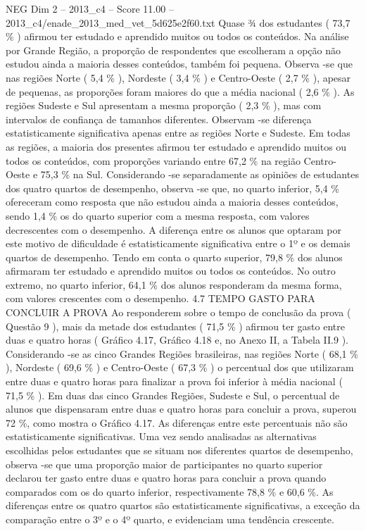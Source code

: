 \begin{textsample}{NEG Dim 2 – 2013\_c4 – Score 11.00 – 2013\_c4/enade\_2013\_med\_vet\_5d625e2f60.txt}
Quase ¾ dos estudantes ( 73,7 \% ) afirmou ter estudado e aprendido muitos ou todos os conteúdos.
Na análise por Grande Região, a proporção de respondentes que escolheram a opção não estudou ainda a maioria desses conteúdos, também foi pequena.
Observa -se que nas regiões Norte ( 5,4 \% ), Nordeste ( 3,4 \% ) e Centro-Oeste ( 2,7 \% ), apesar de pequenas, as proporções foram maiores do que a média nacional ( 2,6 \% ).
As regiões Sudeste e Sul apresentam a mesma proporção ( 2,3 \% ), mas com intervalos de confiança de tamanhos diferentes.
Observam -se diferença estatisticamente significativa apenas entre as regiões Norte e Sudeste.
Em todas as regiões, a maioria dos presentes afirmou ter estudado e aprendido muitos ou todos os conteúdos, com proporções variando entre 67,2 \% na região Centro-Oeste e 75,3 \% na Sul.
Considerando -se separadamente as opiniões de estudantes dos quatro quartos de desempenho, observa -se que, no quarto inferior, 5,4 \% ofereceram como resposta que não estudou ainda a maioria desses conteúdos, sendo 1,4 \% os do quarto superior com a mesma resposta, com valores decrescentes com o desempenho.
A diferença entre os alunos que optaram por este motivo de dificuldade é estatisticamente significativa entre o 1º e os demais quartos de desempenho.
Tendo em conta o quarto superior, 79,8 \% dos alunos afirmaram ter estudado e aprendido muitos ou todos os conteúdos.
No outro extremo, no quarto inferior, 64,1 \% dos alunos responderam da mesma forma, com valores crescentes com o desempenho. 4.7 TEMPO GASTO PARA CONCLUIR A PROVA Ao responderem sobre o tempo de conclusão da prova ( Questão 9 ), mais da metade dos estudantes ( 71,5 \% ) afirmou ter gasto entre duas e quatro horas ( Gráfico 4.17, Gráfico 4.18 e, no Anexo II, a Tabela II.9 ).
Considerando -se as cinco Grandes Regiões brasileiras, nas regiões Norte ( 68,1 \% ), Nordeste ( 69,6 \% ) e Centro-Oeste ( 67,3 \% ) o percentual dos que utilizaram entre duas e quatro horas para finalizar a prova foi inferior à média nacional ( 71,5 \% ).
Em duas das cinco Grandes Regiões, Sudeste e Sul, o percentual de alunos que dispensaram entre duas e quatro horas para concluir a prova, superou 72 \%, como mostra o Gráfico 4.17.
As diferenças entre este percentuais não são estatisticamente significativas.
Uma vez sendo analisadas as alternativas escolhidas pelos estudantes que se situam nos diferentes quartos de desempenho, observa -se que uma proporção maior de participantes no quarto superior declarou ter gasto entre duas e quatro horas para concluir a prova quando comparados com os do quarto inferior, respectivamente 78,8 \% e 60,6 \%.
As diferenças entre os quatro quartos são estatisticamente significativas, a exceção da comparação entre o 3º e o 4º quarto, e evidenciam uma tendência crescente.

\end{textsample}
